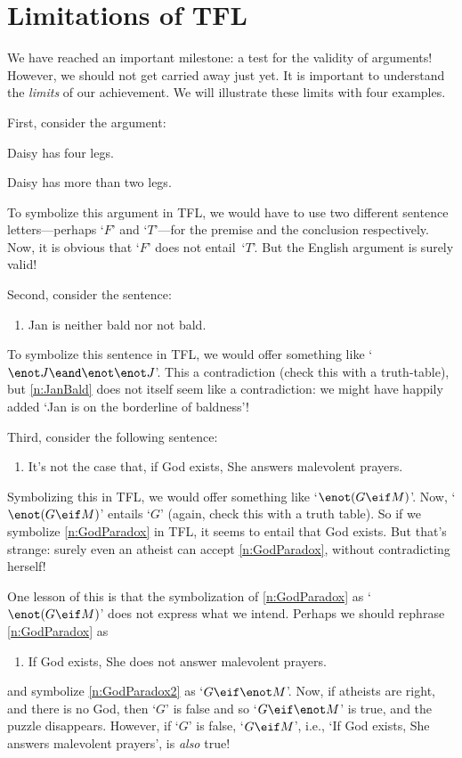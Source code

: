 \chapter{Limitations of TFL}\label{s:ParadoxesOfMaterialConditional}

We have reached an important milestone: a test for the validity of
arguments! However, we should not get carried away just yet. It is
important to understand the \emph{limits} of our achievement. We will
illustrate these limits with four examples.

First, consider the argument: 
	\begin{earg}
		\item Daisy has four legs.
		\item[\texttherefore] Daisy has more than two legs.
	\end{earg}
To symbolize this argument in TFL, we would have to use two different sentence letters---perhaps `$F$'  and `$T$'---for the premise and the conclusion respectively. Now, it is obvious that `$F$' does not entail~`$T$'. But the English argument is surely valid!

Second, consider the sentence:
	\begin{enumerate}
		\item\label{n:JanBald} Jan is neither bald nor not bald.
	\end{enumerate}
To symbolize this sentence in TFL, we would offer something like
`$\enot J \eand \enot \enot J$'. This a contradiction (check this with
a truth-table), but \cref*{n:JanBald} does not itself seem like a
contradiction: we might have happily added `Jan is on the borderline
of baldness'!

Third, consider the following sentence:
	\begin{enumerate}
	\item\label{n:GodParadox} It's not the case that, if God exists, She answers malevolent prayers.
	\end{enumerate}
Symbolizing this in TFL, we would offer something like `$\enot (G \eif M)$'. Now, `$\enot (G \eif M)$' entails `$G$' (again, check this with a truth table). So if we symbolize \cref*{n:GodParadox} in TFL, it seems to entail that God exists. But that's strange: surely even an atheist can accept \cref*{n:GodParadox}, without contradicting herself!

One lesson of this is that the symbolization of \cref*{n:GodParadox} as `$\enot(G \eif M)$' does not express what we intend. Perhaps we should rephrase \cref*{n:GodParadox} as
	\begin{enumerate}
	\item\label{n:GodParadox2} If God exists, She does not answer malevolent prayers.
	\end{enumerate}
and symbolize \cref*{n:GodParadox2} as `$G \eif \enot M$'.  Now, if atheists are right, and there is no God, then `$G$' is false and so `$G \eif \enot M$' is true, and the puzzle disappears. However, if `$G$' is false, `$G \eif M$', i.e., `If God exists, She answers malevolent prayers', is \emph{also} true!

